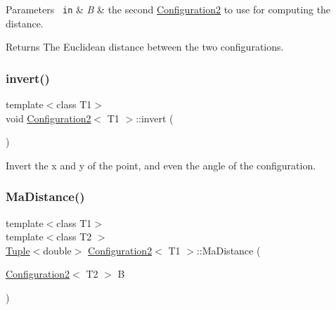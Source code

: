 \begin{DoxyParams}[1]{Parameters}
\mbox{\texttt{ in}}  & {\em B} & the second {\ttfamily \mbox{\hyperlink{class_configuration2}{Configuration2}}} to use for computing the distance. \\
\hline
\end{DoxyParams}
\begin{DoxyReturn}{Returns}
The Euclidean distance between the two configurations. 
\end{DoxyReturn}
\mbox{\label{class_configuration2_a0a63aa5b2089b11bf0f6ec9c65560e56}} 
\subsubsection{\texorpdfstring{invert()}{invert()}}
{\footnotesize\ttfamily template$<$class T1$>$ \\
void \mbox{\hyperlink{class_configuration2}{Configuration2}}$<$ T1 $>$\+::invert (\begin{DoxyParamCaption}{ }\end{DoxyParamCaption})\hspace{0.3cm}{\ttfamily [inline]}}



Invert the x and y of the point, and even the angle of the configuration. 

\mbox{\label{class_configuration2_afb287896fc721e64bc50425795a84a77}} 
\subsubsection{\texorpdfstring{MaDistance()}{MaDistance()}}
{\footnotesize\ttfamily template$<$class T1$>$ \\
template$<$class T2 $>$ \\
\mbox{\hyperlink{class_tuple}{Tuple}}$<$double$>$ \mbox{\hyperlink{class_configuration2}{Configuration2}}$<$ T1 $>$\+::Ma\+Distance (\begin{DoxyParamCaption}\item[{\mbox{\hyperlink{class_configuration2}{Configuration2}}$<$ T2 $>$}]{B }\end{DoxyParamCaption})\hspace{0.3cm}{\ttfamily [inline]}}



